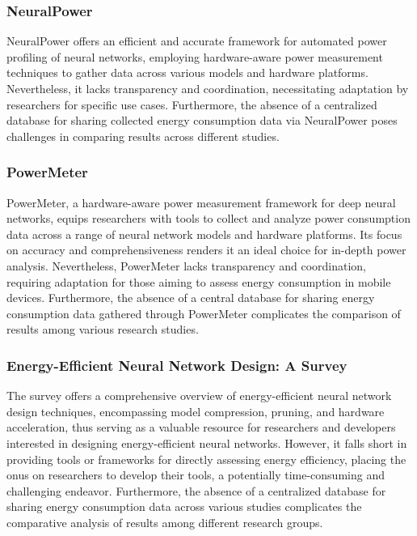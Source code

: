 \subsubsection{NeuralPower \cite{li2022neuralpower}} NeuralPower offers an efficient and accurate framework for automated power profiling of neural networks, employing hardware-aware power measurement techniques to gather data across various models and hardware platforms. Nevertheless, it lacks transparency and coordination, necessitating adaptation by researchers for specific use cases. Furthermore, the absence of a centralized database for sharing collected energy consumption data via NeuralPower poses challenges in comparing results across different studies.

\subsubsection{PowerMeter \cite{chen2021powermeter}} PowerMeter, a hardware-aware power measurement framework for deep neural networks, equips researchers with tools to collect and analyze power consumption data across a range of neural network models and hardware platforms. Its focus on accuracy and comprehensiveness renders it an ideal choice for in-depth power analysis. Nevertheless, PowerMeter lacks transparency and coordination, requiring adaptation for those aiming to assess energy consumption in mobile devices. Furthermore, the absence of a central database for sharing energy consumption data gathered through PowerMeter complicates the comparison of results among various research studies.

\subsubsection{Energy-Efficient Neural Network Design: A Survey \cite{zhang2021energyefficient}} The survey offers a comprehensive overview of energy-efficient neural network design techniques, encompassing model compression, pruning, and hardware acceleration, thus serving as a valuable resource for researchers and developers interested in designing energy-efficient neural networks. However, it falls short in providing tools or frameworks for directly assessing energy efficiency, placing the onus on researchers to develop their tools, a potentially time-consuming and challenging endeavor. Furthermore, the absence of a centralized database for sharing energy consumption data across various studies complicates the comparative analysis of results among different research groups.

